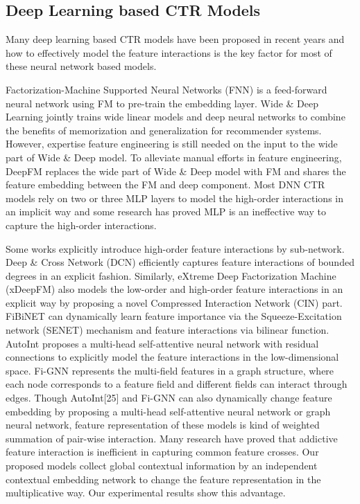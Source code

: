 \documentclass[sigconf]{acmart}
\begin{document}
\subsection{Deep Learning based CTR Models}
Many deep learning based CTR models have been proposed in recent years and how to effectively model the feature interactions is the key factor for most of these neural network based models.


Factorization-Machine Supported Neural Networks (FNN)\cite{zhang2016deep} is a feed-forward neural network using FM to pre-train the embedding layer. Wide \& Deep Learning\cite{xiao2017attentional} jointly trains wide linear models and deep neural networks to combine the benefits of memorization and generalization for recommender systems. However, expertise feature engineering is still needed on the input to the wide part of Wide \& Deep model. To alleviate manual efforts in feature engineering, DeepFM\cite{guo2017deepfm} replaces the wide part of Wide \& Deep model with FM and shares the feature embedding between the FM and deep component. Most DNN CTR models rely on  two or three MLP layers to model the high-order interactions in an implicit way and some research\cite{beutel2018latent} has proved MLP is an ineffective way to capture the high-order interactions.


Some works explicitly introduce high-order feature interactions by sub-network. Deep \& Cross Network (DCN)\cite{wang2017deep} efficiently captures feature interactions of bounded degrees in an explicit fashion. Similarly, eXtreme Deep Factorization Machine (xDeepFM) \cite{lian2018xdeepfm} also models the low-order and high-order feature interactions in an explicit way by proposing a novel Compressed Interaction Network (CIN) part.  FiBiNET\cite{huang2019fibinet} can dynamically learn feature importance via the Squeeze-Excitation network (SENET) mechanism and feature interactions via bilinear function. AutoInt\cite{song2019autoint} proposes a multi-head self-attentive neural network with residual connections to explicitly model the feature interactions in the low-dimensional space. Fi-GNN\cite{2019Fi} represents the multi-field features in a graph structure, where each node corresponds to a feature field and different fields can interact through edges. Though AutoInt[25] and Fi-GNN\cite{2019Fi} can also dynamically change feature embedding by proposing a multi-head self-attentive neural network or graph neural network, feature representation of these models is kind of weighted summation of pair-wise interaction. Many research\cite{2018Latent,2020Neural} have proved that addictive feature interaction is inefficient in capturing common feature crosses. Our proposed models collect global contextual information by an independent contextual embedding network to change the feature representation in the multiplicative way. Our experimental results show this advantage.
\end{document}
